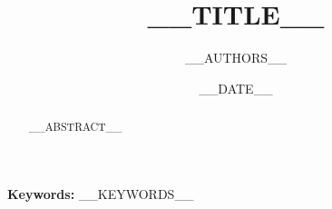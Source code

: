 \documentclass[11pt]{article}
\title{__TITLE__}
\author{__AUTHORS__}
\date{__DATE__}
\theoremstyle{definition}
\theoremstyle{remark}
\begin{document}
\maketitle

\begin{abstract}
\noindent
__ABSTRACT__
\end{abstract}

\noindent\textbf{Keywords:} __KEYWORDS__











\end{document}
